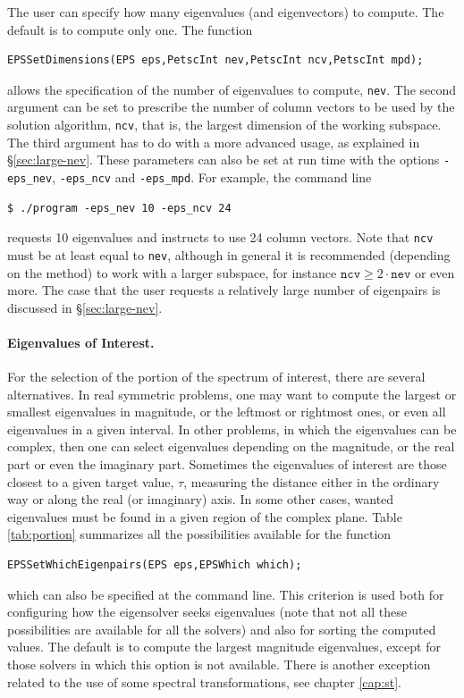 	The user can specify how many eigenvalues (and eigenvectors) to compute. The default is to compute only one. The function
	\begin{Verbatim}[fontsize=\small]
	EPSSetDimensions(EPS eps,PetscInt nev,PetscInt ncv,PetscInt mpd);
	\end{Verbatim}
allows the specification of the number of eigenvalues to compute, \texttt{nev}. The second argument can be set to prescribe the number of column vectors to be used by the solution algorithm, \texttt{ncv}, that is, the largest dimension of the working subspace. The third argument has to do with a more advanced usage, as explained in \S\ref{sec:large-nev}. These parameters can also be set at run time with the options \Verb!-eps_nev!, \Verb!-eps_ncv! and \Verb!-eps_mpd!. For example, the command line
\begin{Verbatim}[fontsize=\small]
	$ ./program -eps_nev 10 -eps_ncv 24
\end{Verbatim}
requests 10 eigenvalues and instructs to use 24 column vectors. Note that \texttt{ncv} must be at least equal to \texttt{nev}, although in general it is recommended (depending on the method) to work with a larger subspace, for instance $\mathtt{ncv}\geq2\cdot\mathtt{nev}$ or even more. The case that the user requests a relatively large number of eigenpairs is discussed in \S\ref{sec:large-nev}.

\paragraph{Eigenvalues of Interest.}

	For the selection of the portion of the spectrum of interest, there are several alternatives. In real symmetric problems, one may want to compute the largest or smallest eigenvalues in magnitude, or the leftmost or rightmost ones, or even all eigenvalues in a given interval. In other problems, in which the eigenvalues can be complex, then one can select eigenvalues depending on the magnitude, or the real part or even the imaginary part. Sometimes the eigenvalues of interest are those closest to a given target value, $\tau$, measuring the distance either in the ordinary way or along the real (or imaginary) axis. In some other cases, wanted eigenvalues must be found in a given region of the complex plane. Table \ref{tab:portion} summarizes all the possibilities available for the function
	\begin{Verbatim}[fontsize=\small]
	EPSSetWhichEigenpairs(EPS eps,EPSWhich which);
	\end{Verbatim}
which can also be specified at the command line. This criterion is used both for configuring how the eigensolver seeks eigenvalues (note that not all these possibilities are available for all the solvers) and also for sorting the computed values. The default is to compute the largest magnitude eigenvalues, except for those solvers in which this option is not available. There is another exception related to the use of some spectral transformations, see chapter \ref{cap:st}.

